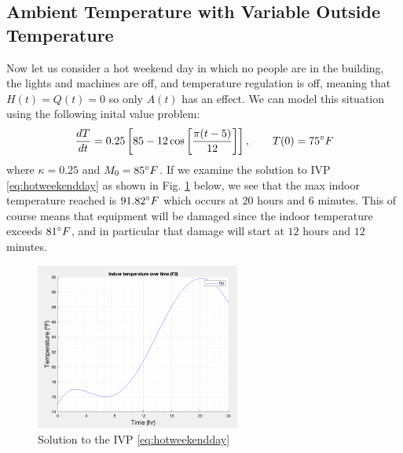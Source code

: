 \documentclass[titlepage]{article}
\begin{document}
\subsection{Ambient Temperature with Variable Outside Temperature} \label{hotweekendday}
Now let us consider a hot weekend day in which no people are in the building, the lights and
machines are off, and temperature regulation is off, meaning that $H(t)=Q(t)=0$ so only $A(t)$ has an effect.
We can model this situation using the following inital value problem:
\begin{equation}\label{eq:hotweekendday}
    \frac{dT}{dt} = 0.25\left[85 - 12\cos\left[\frac{\pi(t-5)}{12}\right]\right], \qquad T(0)=75\degree F
\end{equation}
where $\kappa=0.25$ and $M_0=85\degree F$. If we examine the solution to IVP \ref{eq:hotweekendday}
as shown in Fig. \ref{fig:hotweekendday} below, we see that the max indoor temperature reached is $91.82\degree F$ 
which occurs at $20$ hours and $6$ minutes. This of course means that equipment will be damaged since the indoor temperature
exceeds $81\degree F$, and in particular that damage will start at $12$ hours and $12$ minutes.
\begin{figure}[H]
    \centering
    \includegraphics[width=0.6\textwidth]{./images/hotWeekendDay.png}
    \caption{Solution to the IVP \eqref{eq:hotweekendday}}
    \label{fig:hotweekendday}
\end{figure}




\end{document}
